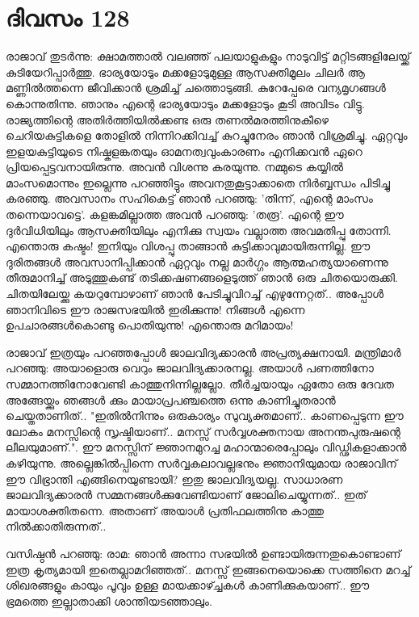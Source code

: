  
\section{ദിവസം 128}


രാജാവ്‌ തുടര്‍ന്നു: ക്ഷാമത്താല്‍ വലഞ്ഞ്‌ പലയാളുകളും നാടുവിട്ട്‌ മറ്റിടങ്ങളിലേയ്ക്ക്‌ കുടിയേറിപ്പാര്‍ത്തു. ഭാര്യയോടും മക്കളോടുമുള്ള ആസക്തിമൂലം ചിലര്‍ ആ മണ്ണില്‍ത്തന്നെ ജീവിക്കാന്‍ ശ്രമിച്ച് ചത്തൊടുങ്ങി. കുറേപ്പേരെ വന്യമൃഗങ്ങള്‍ കൊന്നുതിന്നു. ഞാനും എന്റെ ഭാര്യയോടും മക്കളോടും കൂടി അവിടം വിട്ടു. രാജ്യത്തിന്റെ അതിര്‍ത്തിയില്‍ക്കണ്ട ഒരു തണല്‍മരത്തിനുകീഴെ ചെറിയകുട്ടികളെ തോളില്‍ നിന്നിറക്കിവച്ച്‌ കുറച്ചുനേരം ഞാന്‍ വിശ്രമിച്ചു. ഏറ്റവും ഇളയകുട്ടിയുടെ നിഷ്കളങ്കതയും ഓമനത്വവുംകാരണം എനിക്കവന്‍ ഏറെ പ്രിയപ്പെട്ടവനായിരുന്നു. അവന്‍ വിശന്നു കരയുന്നു. നമ്മുടെ കയ്യില്‍ മാംസമൊന്നും ഇല്ലെന്നു പറഞ്ഞിട്ടും അവനതുകൂട്ടാക്കാതെ നിര്‍ബ്ബന്ധം പിടിച്ചു കരഞ്ഞു. അവസാനം സഹികെട്ട്‌ ഞാന്‍ പറഞ്ഞു: 'തിന്ന്, എന്റെ മാംസം തന്നെയാവട്ടെ'. കളങ്കമില്ലാത്ത അവന്‍ പറഞ്ഞു: 'തരൂ'. എന്റെ ഈ ദുര്‍വിധിയിലും ആസക്തിയിലും  എനിക്കു  സ്വയം വല്ലാത്ത അവമതിപ്പു തോന്നി. എന്തൊരു കഷ്ടം! ഇനിയും വിശപ്പു താങ്ങാന്‍ കുട്ടിക്കാവുമായിരുന്നില്ല. ഈ ദുരിതങ്ങള്‍ അവസാനിപ്പിക്കാന്‍ ഏറ്റവും നല്ല മാര്‍ഗ്ഗം ആത്മഹത്യയാണെന്നു തീരുമാനിച്ച്‌ അടുത്തുകണ്ട്‌ തടിക്കഷണങ്ങളെടുത്ത്‌ ഞാന്‍ ഒരു ചിതയൊരുക്കി. ചിതയിലേയ്ക്കു കയറുമ്പോഴാണ്‌ ഞാന്‍ പേടിച്ചുവിറച്ച്‌ എഴുന്നേറ്റത്‌.. അപ്പോള്‍ ഞാനിവിടെ ഈ രാജസഭയില്‍ ഇരിക്കുന്നു! നിങ്ങള്‍ എന്നെ ഉപചാരങ്ങള്‍കൊണ്ടു പൊതിയുന്നു! എന്തൊരു മറിമായം!

രാജാവ്‌ ഇത്രയും പറഞ്ഞപ്പോള്‍ ജാലവിദ്യക്കാരന്‍ അപ്രത്യക്ഷനായി. മന്ത്രിമാര്‍ പറഞ്ഞു: അയാളൊരു വെറും ജാലവിദ്യക്കാരനല്ല. അയാള്‍ പണത്തിനോ സമ്മാനത്തിനോവേണ്ടി കാത്തുനിന്നില്ലല്ലോ. തീര്‍ച്ചയായും ഏതോ ഒരു ദേവത അങ്ങേയ്ക്കും ഞങ്ങള്‍ ക്കും മായാപ്രപഞ്ചത്തെ ഒന്നു കാണിച്ചുതരാന്‍ ചെയ്തതാണിത്‌.. "ഇതില്‍നിന്നും ഒരുകാര്യം സുവ്യക്തമാണ്‌.. കാണപ്പെടുന്ന ഈ ലോകം മനസ്സിന്റെ സൃഷ്ടിയാണ്‌.. മനസ്സ്‌ സര്‍വ്വശക്തനായ അനന്തപുരുഷന്റെ ലീലയുമാണ്‌.". ഈ മനസ്സിന്‌ ജ്ഞാനമുറച്ച മഹാന്മാരെപ്പോലും വിഡ്ഢികളാക്കാന്‍ കഴിയുന്നു. അല്ലെങ്കില്‍പ്പിന്നെ സര്‍വ്വകലാവല്ലഭനും ജ്ഞാനിയുമായ രാജാവിന്‌ ഈ വിഭ്രാന്തി എങ്ങിനെയുണ്ടായി? ഇതു ജാലവിദ്യയല്ല. സാധാരണ ജാലവിദ്യക്കാരന്‍ സമ്മനങ്ങള്‍ക്കുവേണ്ടിയാണ്‌ ജോലിചെയ്യുന്നത്‌.. ഇത്‌ മായാശക്തിതന്നെ. അതാണ്‌ അയാള്‍ പ്രതിഫലത്തിനു കാത്തു നില്‍ക്കാതിരുന്നത്‌..

വസിഷ്ഠന്‍ പറഞ്ഞു: രാമ: ഞാന്‍ അന്നാ സഭയില്‍ ഉണ്ടായിരുന്നതുകൊണ്ടാണ്‌ ഇത്ര കൃത്യമായി ഇതെല്ലാമറിഞ്ഞത്‌.. മനസ്സ്‌ ഇങ്ങനെയൊക്കെ സത്തിനെ മറച്ച്‌ ശിഖരങ്ങളും കായും പൂവും ഉള്ള മായക്കാഴ്ച്ചകള്‍ കാണിക്കുകയാണ്‌.. ഈ ഭ്രമത്തെ ഇല്ലാതാക്കി ശാന്തിയടഞ്ഞാലും. 

